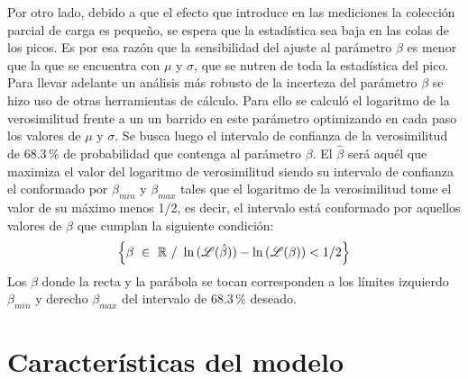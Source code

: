Por otro lado, debido a que el efecto que introduce en las mediciones la colección parcial de carga es pequeño, se espera que la estadística sea baja en las colas de los picos. Es por esa razón que la sensibilidad del ajuste al parámetro $\beta$ es menor que la que se encuentra con $\mu$ y $\sigma$, que se nutren de toda la estadística del pico. Para llevar adelante un análisis más robusto de la incerteza del parámetro $\beta$ se hizo uso de otras herramientas de cálculo. Para ello se calculó el logaritmo de la verosimilitud frente a un un barrido en este parámetro optimizando en cada paso los valores de $\mu$ y $\sigma$. Se busca luego el intervalo de confianza de la verosimilitud de $68.3\,\%$ de probabilidad que contenga al parámetro $\beta$. El $\hat{\beta}$ será aquél que maximiza el valor del logaritmo de verosimilitud siendo su intervalo de confianza el conformado por $\beta_{min}$ y $\beta_{max}$ tales que el logaritmo de la verosimilitud tome el valor de su máximo menos 1/2, es decir, el intervalo está conformado por aquellos valores de $\beta$ que cumplan la siguiente condición:
\begin{equation*}
    \left\{
        \beta\ \in\ \mathbb{R}\ /\ 
        \ln{(\Lagr(\hat{\beta}))}
        -
        \ln{
            \left(
                \Lagr(\beta)
            \right)
            }
        < 1/2
    \right\}
\end{equation*}
Los $\beta$ donde la recta y la parábola se tocan corresponden a los límites izquierdo $\beta_{min}$ y derecho $\beta_{max}$ del intervalo de $68.3\,\%$ deseado\cite{Frodesen}.


\section{Características del modelo}


